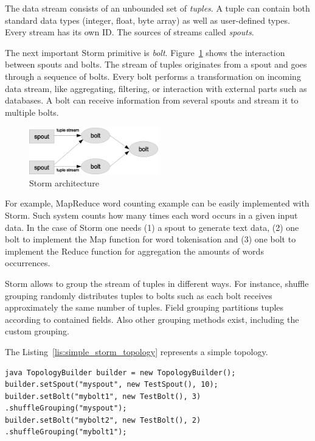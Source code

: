 The data stream consists of an unbounded set of \textit{tuples}.
A tuple can contain both standard data types (integer, float, byte array) as well as user-defined types.
Every stream has its own ID.
The sources of streams called \textit{spouts}. 

The next important Storm primitive is \textit{bolt}.
Figure~\ref{fig:storm_architecture} shows the interaction between spouts and bolts.
The stream of tuples originates from a spout and goes through a sequence of bolts.
Every bolt performs a transformation on incoming data stream, like aggregating, filtering, or interaction with external parts such as databases.
A bolt can receive information from several spouts and stream it to multiple bolts.

\begin{figure}
  \centering
  \includegraphics [width=0.5\textwidth]{images/storm_architecture}
  \caption{Storm architecture}
  \label{fig:storm_architecture}
\end{figure}

For example, MapReduce word counting example can be easily implemented with Storm.
Such system counts how many times each word occurs in a given input data.
In the case of Storm one needs 
(1) a spout to generate text data, 
(2) one bolt to implement the Map function for word tokenisation and 
(3) one bolt to implement the Reduce function for aggregation the amounts of words occurrences. 

Storm allows to group the stream of tuples in different ways.
For instance, shuffle grouping randomly distributes tuples to bolts such as each bolt receives approximately the same number of tuples.
Field grouping partitions tuples according to contained fields.
Also other grouping methods exist, including the custom grouping.

The Listing~\ref{lis:simple_storm_topology} represents a simple topology.

\begin{lstlisting}[caption=Simple Storm topology, label=lis:simple_storm_topology]
java TopologyBuilder builder = new TopologyBuilder();
builder.setSpout("myspout", new TestSpout(), 10);
builder.setBolt("mybolt1", new TestBolt(), 3) .shuffleGrouping("myspout");
builder.setBolt("mybolt2", new TestBolt(), 2) .shuffleGrouping("mybolt1");
\end{lstlisting}

